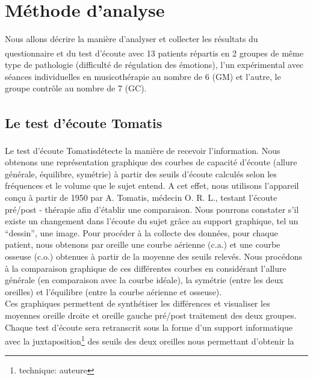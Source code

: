 \section{Méthode d'analyse}
Nous allons décrire la manière d'analyser et collecter les résultats du questionnaire et du test 
d'écoute\textsuperscript \textregistered  
avec 13 patients répartis en 2 groupes de même type de pathologie (difficulté de régulation des 
émotions), l'un expérimental avec séances individuelles en musicothérapie au nombre de 6 (GM) et 
l'autre, le groupe contrôle au 
nombre 
de 7 (GC).
\subsection {Le test d'écoute Tomatis\textsuperscript \textregistered }
Le test d'écoute Tomatis\textsuperscript \textregistered détecte la manière de recevoir
l'information.
Nous obtenons une
représentation graphique des courbes de capacité d'écoute
(allure générale, équilibre, symétrie) à partir des seuils d'écoute
calculés selon les fréquences et le volume que le sujet entend.
A cet effet, nous utilisons l'appareil conçu à partir de 1950 par A. Tomatis, médecin
O. R. L., testant
l'écoute pré/post - thérapie
afin d'établir une comparaison.
Nous pourrons constater
s'il existe un changement dans l'écoute du sujet grâce au support graphique, tel un ``dessin'',
une image. %
Pour procéder à la collecte des données, pour chaque patient, nous obtenons par oreille  une courbe 
aérienne (c.a.) et une 
courbe osseuse (c.o.) obtenues à partir de  la moyenne des seuils relevés.
Nous procédons à la comparaison graphique de ces différentes courbes en considérant l'allure générale 
(en comparaison avec la courbe idéale), 
la symétrie (entre les deux oreilles) et l'équilibre (entre la courbe aérienne et osseuse).
\\
Ces graphiques permettent  de synthétiser les différences et visualiser les 
moyennes oreille droite et oreille gauche pré/post 
traitement des 
deux groupes. Chaque test d'écoute sera retranscrit  sous la forme d'un support informatique avec 
la juxtaposition\footnote{technique: auteure} des seuils des deux oreilles nous permettant d'obtenir la 
